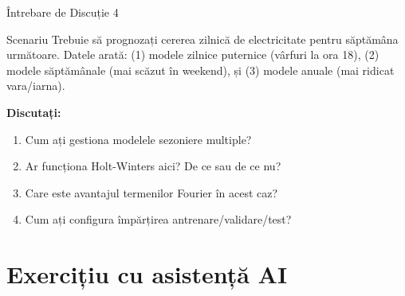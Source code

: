 \documentclass[9pt, aspectratio=169, t]{beamer}
\begin{document}
\begin{frame}{Întrebare de Discuție 4}
    \begin{block}{Scenariu}
        Trebuie să prognozați cererea zilnică de electricitate pentru săptămâna următoare. Datele arată: (1) modele zilnice puternice (vârfuri la ora 18), (2) modele săptămânale (mai scăzut în weekend), și (3) modele anuale (mai ridicat vara/iarna).
    \end{block}

    \vspace{0.4cm}

    \textbf{Discutați:}
    \begin{enumerate}
        \item Cum ați gestiona modelele sezoniere multiple?
        \item Ar funcționa Holt-Winters aici? De ce sau de ce nu?
        \item Care este avantajul termenilor Fourier în acest caz?
        \item Cum ați configura împărțirea antrenare/validare/test?
    \end{enumerate}
\end{frame}

\section{Exercițiu cu asistență AI}
\end{document}
